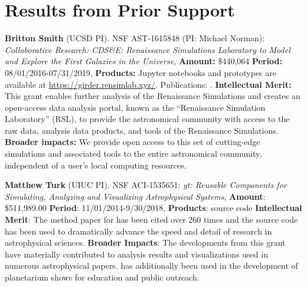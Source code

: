 \section{Results from Prior Support}

\noindent \textbf{Britton Smith} (UCSD PI). NSF AST-1615848 (PI: Michael
Norman): \textit{Collaborative Research: CDS\&E: Renaissance Simulations
Laboratory to Model and Explore the First Galaxies in the Universe},
\textbf{Amount:} \$440,064
\textbf{Period:} 08/01/2016-07/31/2019,
\textbf{Products:} Jupyter notebooks and prototypes are available at
\url{https://girder.rensimlab.xyz/}.  Publications:
\citep{2016ApJ...832L...5X, 2016ApJ...833...84X, Barrow17_FL2,
2017ApJ...845...47T, 2017ApJ...847...59H}.
\textbf{Intellectual Merit:} This grant enables further analysis of
the Renaissance Simulations \citep{2015ApJ...807L..12O} and creates
an open-access data analysis portal, known as the ``Renaissance Simulation
Laboratory'' (RSL), to provide the astronomical community with access
to the raw data, analysis data products, and tools of the Renaissance
Simulations.
\textbf{Broader impacts:}
We provide open access to this set of cutting-edge
simulations and associated tools to the entire astronomical community,
independent of a user's local computing resources.

\noindent \textbf{Matthew Turk} (UIUC PI).  
NSF ACI-1535651: \textit{yt: Reusable Components for Simulating,
Analyzing and Visualizing Astrophysical Systems},
\textbf{Amount}: \$511,989.00
\textbf{Period}: 11/01/2014-9/30/2018,
\textbf{Products}: \yt{} source code
\textbf{Intellectual Merit}: The method paper for \yt{} has been cited over
260 times and the source code has been used to dramatically advance the speed
and detail of research in astrophysical sciences.
\textbf{Broader Impacts}: The developments from this grant have materially
contributed to analysis results and visualizations used in numerous
astrophysical papers. \yt{} has additionally been used in the development
of planetarium shows for education and public outreach.
